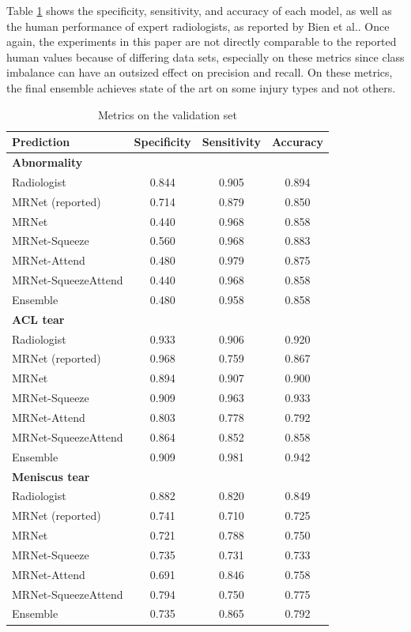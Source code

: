 \documentclass[conference]{IEEEtran}
\begin{document}
Table \ref{tab:metrics} shows the specificity, sensitivity, and accuracy of each model, as well as the human performance of expert radiologists, as reported by Bien et al.\cite{bien2018deep}. Once again, the experiments in this paper are not directly comparable to the reported human values because of differing data sets, especially on these metrics since class imbalance can have an outsized effect on precision and recall. On these metrics, the final ensemble achieves state of the art on some injury types and not others.

\begin{table}[h!]
\begin{center}
\begin{tabular}{|l|c|c|c|}
\hline
Prediction & Specificity & Sensitivity & Accuracy \\
\hline
\multicolumn{4}{l}{\textbf{Abnormality} }\\
\hline
Radiologist & 0.844 & 0.905 & 0.894 \\
MRNet (reported) & 0.714 & 0.879 & 0.850 \\
\hline
MRNet & 0.440 & 0.968 & 0.858 \\
MRNet-Squeeze & 0.560 & 0.968 & 0.883 \\
MRNet-Attend & 0.480 & 0.979 & 0.875  \\
MRNet-SqueezeAttend & 0.440 & 0.968 & 0.858 \\
\hline
Ensemble & 0.480 & 0.958 & 0.858 \\
\hline
\multicolumn{4}{l}{\textbf{ACL tear} }\\
\hline
Radiologist & 0.933 & 0.906 & 0.920 \\
MRNet (reported) & 0.968 & 0.759 & 0.867 \\
\hline
MRNet & 0.894 & 0.907 & 0.900 \\
MRNet-Squeeze & 0.909 & 0.963 & 0.933 \\
MRNet-Attend & 0.803 & 0.778 &  0.792 \\
MRNet-SqueezeAttend & 0.864 & 0.852 & 0.858 \\
\hline
Ensemble & 0.909 & 0.981 & 0.942 \\
\hline
\multicolumn{4}{l}{\textbf{Meniscus tear} }\\
\hline
Radiologist & 0.882 & 0.820 & 0.849 \\
MRNet (reported) & 0.741 & 0.710 & 0.725 \\
\hline
MRNet & 0.721 & 0.788 & 0.750 \\
MRNet-Squeeze & 0.735 & 0.731 & 0.733 \\
MRNet-Attend & 0.691 & 0.846 &  0.758 \\
MRNet-SqueezeAttend & 0.794 & 0.750 & 0.775 \\

\hline
Ensemble & 0.735 & 0.865 & 0.792 \\
\hline
\end{tabular}
\end{center}
\caption{Metrics on the validation set}
\label{tab:metrics}
\end{table}
\end{document}
